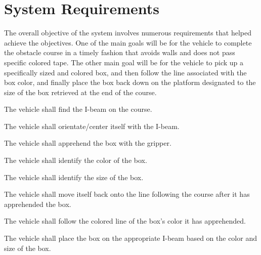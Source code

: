 \documentclass[11pt]{report}
\begin{document}
\chapter{System Requirements}\label{ch:system-requirements}

The overall objective of the system involves numerous requirements that helped achieve the objectives. One of the main goals will be for the vehicle to complete the obstacle course in a timely fashion that avoids walls and does not pass specific colored tape. The other main goal will be for the vehicle to pick up a specifically sized and colored box, and then follow the line associated with the box color, and finally place the box back down on the platform designated to the size of the box retrieved at the end of the course.

\label{sc:box-pick-up-and-placement-system}
\begin{greylineformat}
\vspace{-1.6em}
\label{sub:recognition-of-the-i-beam}
The vehicle shall find the I-beam on the course.

\label{sub:orientation-of-the-i-beam}
The vehicle shall orientate/center itself with the I-beam.

\label{sub:apprehend-the-box}
The vehicle shall apprehend the box with the gripper.

\label{sub:identify-the-color-of-the-box}
The vehicle shall identify the color of the box.

\label{sub:identify-the-size-of-the-box}
The vehicle shall identify the size of the box. 

\label{sub:realign-with-the-line-following-course}
The vehicle shall move itself back onto the line following the course after it has apprehended the box.

\label{sub:follow-the-line-of-the-color-of-the-box-and-return}
The vehicle shall follow the colored line of the box’s color it has apprehended.

\label{sub:placement-of-the-box}
The vehicle shall place the box on the appropriate I-beam based on the color and size of the box.
\end{greylineformat}
\end{document}
